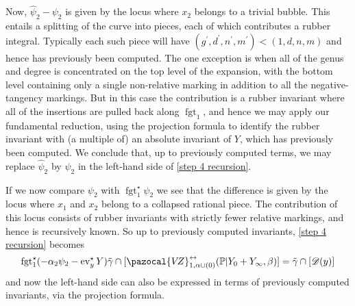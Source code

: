\documentclass[11pt]{amsart}
\newcommand{\VZ}{\pazocal{V\!Z}}
\newcommand{\st}{\star}
\newcommand{\ev}{\operatorname{ev}}
\newcommand{\fgt}{\operatorname{fgt}}
\newcommand{\Dcal}{\mathcal{D}}
\theoremstyle{definition}
\theoremstyle{definition}
\begin{document}
Now, $\hat\psi_2 - \psi_2$ is given by the locus where $x_2$ belongs to a trivial bubble. This entails a splitting of the curve into pieces, each of which contributes a rubber integral. Typically each such piece will have $(g^\prime,d^\prime,n^\prime,m^\prime) < (1,d,n,m)$ and hence has previously been computed. The one exception is when all of the genus and degree is concentrated on the top level of the expansion, with the bottom level containing only a single non-relative marking in addition to all the negative-tangency markings. But in this case the contribution is a rubber invariant where all of the insertions are pulled back along $\fgt_1$, and hence we may apply our fundamental reduction, using the projection formula to identify the rubber invariant with (a multiple of) an absolute invariant of $Y$, which has previously been computed. We conclude that, up to previously computed terms, we may replace $\hat\psi_2$ by $\psi_2$ in the left-hand side of \eqref{step 4 recursion}.

If we now compare $\psi_2$ with $\fgt_1^\st \psi_2$ we see that the difference is given by the locus where $x_1$ and $x_2$ belong to a collapsed rational piece. The contribution of this locus consists of rubber invariants with strictly fewer relative markings, and hence is recursively known. So up to previously computed invariants, \eqref{step 4 recursion} becomes
\begin{equation}\label{step 4 recursion 2} \fgt_1^\st (-\alpha_2\psi_2 - \ev_y^\st Y)\tilde\gamma \cap [\VZ^{\leftrightarrow}_{1,\alpha\cup(0)}(\mathbb P|Y_0+Y_\infty,\beta)] = \tilde\gamma\cap[\Dcal(y)]\end{equation}
and now the left-hand side can also be expressed in terms of previously computed invariants, via the projection formula. \medskip
\end{document}
